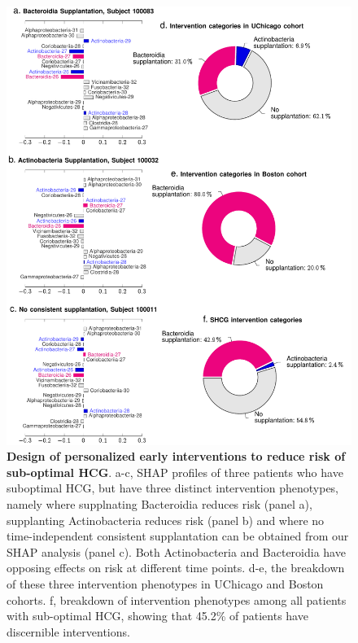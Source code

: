 \documentclass[onecolumn,10pt]{IEEEtran}
\newcommand{\captionN}[1]{\caption{\color{darkgray} \sffamily \fontsize{9}{10}\selectfont #1  }}
\def\bact{Bacteroidia\xspace}
\def\actn{Actinobacteria\xspace}
\begin{document}
\begin{figure}[!ht]  
\centering
\includegraphics[width=\textwidth]{fig6.pdf}
\captionN{\textbf{Design of personalized early interventions to reduce risk of sub-optimal HCG}. a-c, SHAP profiles of three patients who have suboptimal HCG, but have three distinct intervention phenotypes, namely where supplnating \bact reduces risk (panel a), supplanting \actn reduces risk (panel b) and where no time-independent consistent supplantation can be obtained from our SHAP analysis (panel c). Both \actn and \bact have opposing effects on risk at different time points. d-e, the breakdown of these three intervention phenotypes in UChicago and Boston cohorts. f, breakdown of intervention phenotypes among all patients with sub-optimal HCG, showing that 45.2\% of patients have discernible interventions.  }\label{fig:shapphn}
\end{figure}
\end{document}
